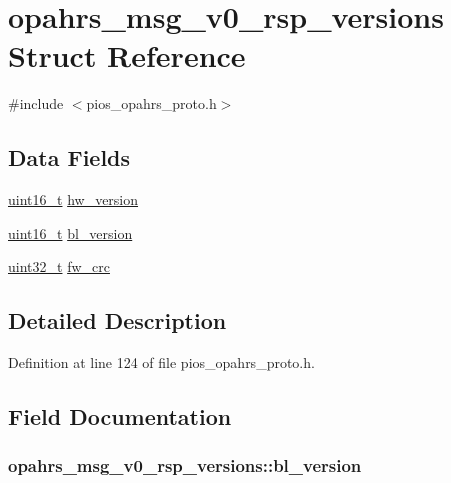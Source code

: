 \hypertarget{structopahrs__msg__v0__rsp__versions}{\section{opahrs\-\_\-msg\-\_\-v0\-\_\-rsp\-\_\-versions Struct Reference}
\label{structopahrs__msg__v0__rsp__versions}
}


{\ttfamily \#include $<$pios\-\_\-opahrs\-\_\-proto.\-h$>$}

\subsection*{Data Fields}
\begin{DoxyCompactItemize}
\item 
\hyperlink{stdint_8h_a273cf69d639a59973b6019625df33e30}{uint16\-\_\-t} \hyperlink{structopahrs__msg__v0__rsp__versions_a5ae484673fec2445758ec852a3d04661}{hw\-\_\-version}
\item 
\hyperlink{stdint_8h_a273cf69d639a59973b6019625df33e30}{uint16\-\_\-t} \hyperlink{structopahrs__msg__v0__rsp__versions_a63fe4fb21391e84257678e5630fdbd6b}{bl\-\_\-version}
\item 
\hyperlink{stdint_8h_a435d1572bf3f880d55459d9805097f62}{uint32\-\_\-t} \hyperlink{structopahrs__msg__v0__rsp__versions_ad2fa4e6c6243362e5f549d00832d5842}{fw\-\_\-crc}
\end{DoxyCompactItemize}


\subsection{Detailed Description}


Definition at line 124 of file pios\-\_\-opahrs\-\_\-proto.\-h.



\subsection{Field Documentation}
\hypertarget{structopahrs__msg__v0__rsp__versions_a63fe4fb21391e84257678e5630fdbd6b}{
\subsubsection[{bl\-\_\-version}]{ opahrs\-\_\-msg\-\_\-v0\-\_\-rsp\-\_\-versions\-::bl\-\_\-version}}\label{structopahrs__msg__v0__rsp__versions_a63fe4fb21391e84257678e5630fdbd6b}


